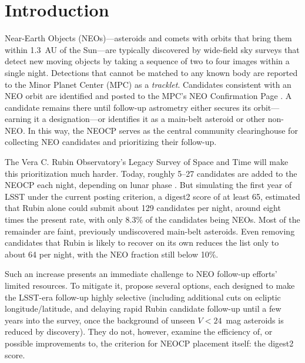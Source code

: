 \documentclass[linenumbers,twocolumn]{aastex701}
\begin{document}



\section{Introduction}
\label{sec:intro}

Near-Earth Objects (NEOs)---asteroids and comets with orbits that bring them
within 1.3~AU of the Sun---are typically discovered by wide-field sky surveys
that detect new moving objects by taking a sequence of two to four images
within a single night. Detections that cannot be matched to any known body are
reported to the Minor Planet Center (MPC) as a \emph{tracklet}. Candidates
consistent with an NEO orbit are identified and posted to the MPC's NEO
Confirmation Page \citep[NEOCP;][]{marsden1998,spoto2021}. A candidate remains
there until follow-up astrometry either secures its orbit---earning it a
designation---or identifies it as a main-belt asteroid or other non-NEO. In
this way, the NEOCP serves as the central community clearinghouse for
collecting NEO candidates and prioritizing their follow-up.

The Vera C. Rubin Observatory's Legacy Survey of Space and Time
\citep[LSST;][]{ivezic2019} will make this prioritization much harder. Today,
roughly 5--27 candidates are added to the NEOCP each night, depending on lunar
phase \citep{wagg2025}. But simulating the first year of LSST under the current
posting criterion, a digest2 score of at least 65, \citet{wagg2025} estimated
that Rubin alone could submit about 129 candidates per night, around eight
times the present rate, with only 8.3\% of the candidates being NEOs. Most of
the remainder are faint, previously undiscovered main-belt asteroids. Even
removing candidates that Rubin is likely to recover on its own reduces the
list only to about 64 per night, with the NEO fraction still below 10\%.

Such an increase presents an immediate challenge to NEO follow-up efforts'
limited resources. To mitigate it, \citet{wagg2025} propose several options,
each designed to make the LSST-era follow-up highly selective (including
additional cuts on ecliptic longitude/latitude, and delaying rapid Rubin
candidate follow-up until a few years into the survey, once the background of
unseen $V<24$~mag asteroids is reduced by discovery). They do not, however,
examine the efficiency of, or possible improvements to, the criterion for
NEOCP placement itself: the digest2 score.
\end{document}
